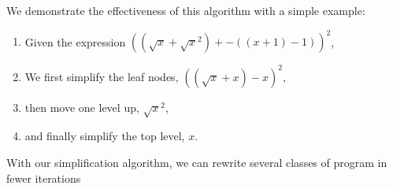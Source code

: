 \documentclass{article}
\newcommand{\sqrsqrt}[1]{\sqrt{#1}^2}
\begin{document}
We demonstrate the effectiveness of this algorithm 
with a simple example:

\begin{enumerate}
\item Given the expression
$((\sqrt{x} + \sqrsqrt{x}) + -((x + 1) - 1))^2$,
\item We first simplify the leaf nodes,
$((\sqrt{x} + x) -x)^2$,
\item then move one level up, 
$\sqrt{x}^2$,
\item and finally simplify the top level,
$x$.
\end{enumerate}

With our simplification algorithm, 
we can rewrite several classes of program
in fewer iterations
\end{document}
